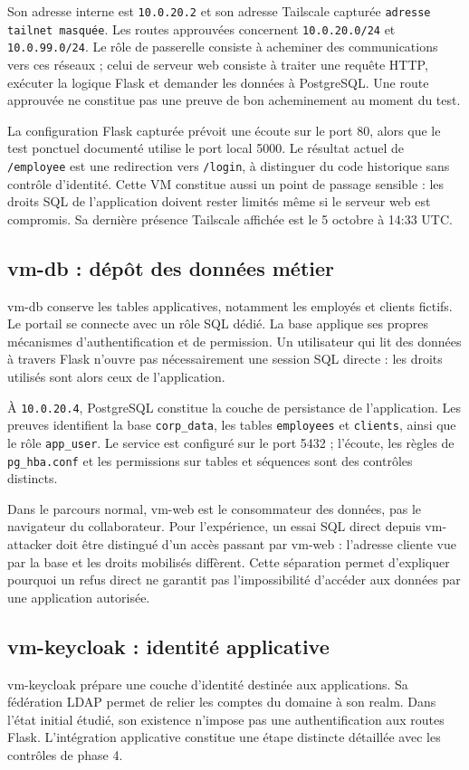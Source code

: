 \documentclass[a4paper,12pt]{report}
\begin{document}
Son adresse interne est \texttt{10.0.20.2} et son adresse Tailscale capturée \texttt{adresse tailnet masquée}. Les routes approuvées concernent \texttt{10.0.20.0/24} et \texttt{10.0.99.0/24}. Le rôle de passerelle consiste à acheminer des communications vers ces réseaux ; celui de serveur web consiste à traiter une requête HTTP, exécuter la logique Flask et demander les données à PostgreSQL. Une route approuvée ne constitue pas une preuve de bon acheminement au moment du test.

La configuration Flask capturée prévoit une écoute sur le port 80, alors que le test ponctuel documenté utilise le port local 5000. Le résultat actuel de \texttt{/employee} est une redirection vers \texttt{/login}, à distinguer du code historique sans contrôle d'identité. Cette VM constitue aussi un point de passage sensible : les droits SQL de l'application doivent rester limités même si le serveur web est compromis. Sa dernière présence Tailscale affichée est le 5 octobre à 14:33 UTC.

\subsection{vm-db : dépôt des données métier}
vm-db conserve les tables applicatives, notamment les employés et clients fictifs. Le portail se connecte avec un rôle SQL dédié. La base applique ses propres mécanismes d'authentification et de permission. Un utilisateur qui lit des données à travers Flask n'ouvre pas nécessairement une session SQL directe : les droits utilisés sont alors ceux de l'application.

À \texttt{10.0.20.4}, PostgreSQL constitue la couche de persistance de l'application. Les preuves identifient la base \texttt{corp\_data}, les tables \texttt{employees} et \texttt{clients}, ainsi que le rôle \texttt{app\_user}. Le service est configuré sur le port 5432 ; l'écoute, les règles de \texttt{pg\_hba.conf} et les permissions sur tables et séquences sont des contrôles distincts.

Dans le parcours normal, vm-web est le consommateur des données, pas le navigateur du collaborateur. Pour l'expérience, un essai SQL direct depuis vm-attacker doit être distingué d'un accès passant par vm-web : l'adresse cliente vue par la base et les droits mobilisés diffèrent. Cette séparation permet d'expliquer pourquoi un refus direct ne garantit pas l'impossibilité d'accéder aux données par une application autorisée.

\subsection{vm-keycloak : identité applicative}
vm-keycloak prépare une couche d'identité destinée aux applications. Sa fédération LDAP permet de relier les comptes du domaine à son realm. Dans l'état initial étudié, son existence n'impose pas une authentification aux routes Flask. L'intégration applicative constitue une étape distincte détaillée avec les contrôles de phase 4.
\end{document}
